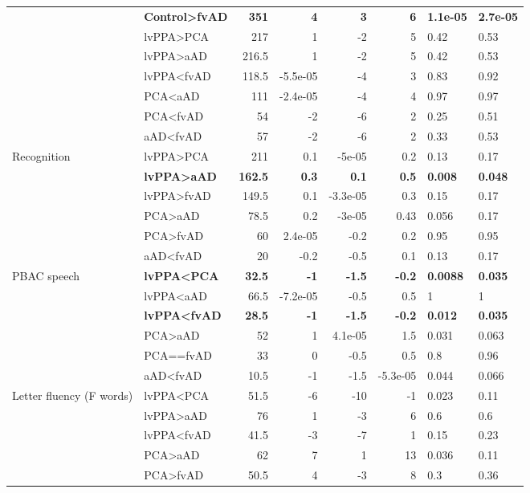 \documentclass[]{article}
\begin{document}
\begin{table}[ht]
{\begin{tabular}{llrrrrll}
   & \textbf{Control>fvAD} & \textbf{351} & \textbf{4} & \textbf{3} & \textbf{6} & \textbf{1.1e-05} & \textbf{2.7e-05} \\ 
   & lvPPA>PCA & 217 & 1 & -2 & 5 & 0.42 & 0.53 \\ 
   & lvPPA>aAD & 216.5 & 1 & -2 & 5 & 0.42 & 0.53 \\ 
   & lvPPA<fvAD & 118.5 & -5.5e-05 & -4 & 3 & 0.83 & 0.92 \\ 
   & PCA<aAD & 111 & -2.4e-05 & -4 & 4 & 0.97 & 0.97 \\ 
   & PCA<fvAD & 54 & -2 & -6 & 2 & 0.25 & 0.51 \\ 
   & aAD<fvAD & 57 & -2 & -6 & 2 & 0.33 & 0.53 \\ 
  Recognition & lvPPA>PCA & 211 & 0.1 & -5e-05 & 0.2 & 0.13 & 0.17 \\ 
   & \textbf{lvPPA>aAD} & \textbf{162.5} & \textbf{0.3} & \textbf{0.1} & \textbf{0.5} & \textbf{0.008} & \textbf{0.048} \\ 
   & lvPPA>fvAD & 149.5 & 0.1 & -3.3e-05 & 0.3 & 0.15 & 0.17 \\ 
   & PCA>aAD & 78.5 & 0.2 & -3e-05 & 0.43 & 0.056 & 0.17 \\ 
   & PCA>fvAD & 60 & 2.4e-05 & -0.2 & 0.2 & 0.95 & 0.95 \\ 
   & aAD<fvAD & 20 & -0.2 & -0.5 & 0.1 & 0.13 & 0.17 \\ 
  PBAC speech & \textbf{lvPPA<PCA} & \textbf{32.5} & \textbf{-1} & \textbf{-1.5} & \textbf{-0.2} & \textbf{0.0088} & \textbf{0.035} \\ 
   & lvPPA<aAD & 66.5 & -7.2e-05 & -0.5 & 0.5 & 1 & 1 \\ 
   & \textbf{lvPPA<fvAD} & \textbf{28.5} & \textbf{-1} & \textbf{-1.5} & \textbf{-0.2} & \textbf{0.012} & \textbf{0.035} \\ 
   & PCA>aAD & 52 & 1 & 4.1e-05 & 1.5 & 0.031 & 0.063 \\ 
   & PCA==fvAD & 33 & 0 & -0.5 & 0.5 & 0.8 & 0.96 \\ 
   & aAD<fvAD & 10.5 & -1 & -1.5 & -5.3e-05 & 0.044 & 0.066 \\ 
  Letter fluency (F words) & lvPPA<PCA & 51.5 & -6 & -10 & -1 & 0.023 & 0.11 \\ 
   & lvPPA>aAD & 76 & 1 & -3 & 6 & 0.6 & 0.6 \\ 
   & lvPPA<fvAD & 41.5 & -3 & -7 & 1 & 0.15 & 0.23 \\ 
   & PCA>aAD & 62 & 7 & 1 & 13 & 0.036 & 0.11 \\ 
   & PCA>fvAD & 50.5 & 4 & -3 & 8 & 0.3 & 0.36 \\ 

\end{tabular}}
\end{table}
\end{document}
